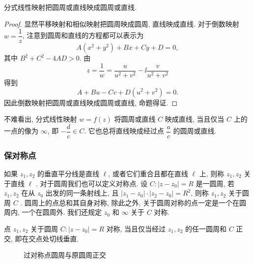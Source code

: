 \begin{theorem}
  分式线性映射把圆周或直线映成圆周或直线.
\end{theorem}

\begin{proof}
  显然平移映射和相似映射把圆周映成圆周, 直线映成直线.
  对于倒数映射 $w=\dfrac1z$, 注意到圆周和直线的方程都可以表示为
  \[
    A(x^2+y^2)+Bx+Cy+D=0,
  \]
  其中 $B^2+C^2-4AD>0$. 由
  \[
      z
    =\frac1w
    =\frac{u}{u^2+v^2}-\ii \frac{v}{u^2+v^2}
  \]
  得到
  \[
    A+Bu-Cv+D(u^2+v^2)=0.
  \]
  因此倒数映射把圆周或直线映成圆周或直线, 命题得证.
\end{proof}

不难看出, 分式线性映射 $w=f(z)$ 将圆周或直线 $C$ 映成直线, 当且仅当 $C$ 上的一点的像为 $\infty$, 即 $-\dfrac dc\in C$.
它也总将直线映成经过点 $\dfrac ac$ 的圆周或直线.


\subsubsection{保对称点}

如果 $z_1,z_2$ 的垂直平分线是直线 $\ell$, 或者它们重合且都在直线 $\ell$ 上, 则称 $z_1,z_2$ 关于直线 $\ell$ .
对于圆周我们也可以定义对称点.
设 $C:|z-z_0|=R$ 是一圆周, 若 $z_1,z_2$ 在从 $z_0$ 出发的同一条射线上, 且 $|z_1-z_0|\cdot|z_2-z_0|=R^2$, 则称 $z_1,z_2$ 关于圆周 $C$ .
圆周上的点总和其自身对称, 除此之外, 关于圆周对称的点一定是一个在圆周内, 一个在圆周外.
我们还规定 $z_0$ 和 $\infty$ 关于 $C$ 对称.

\begin{lemma}
  \label{lem:symmetry-circle}
  点 $z_1,z_2$ 关于圆周 $C:|z-z_0|=R$ 对称, 当且仅当经过 $z_1,z_2$ 的任一圆周和 $C$ 正交, 即在交点处切线垂直.
\end{lemma}

\begin{figure}[!htb]
  \centering
  \caption{过对称点圆周与原圆周正交}
\end{figure}


